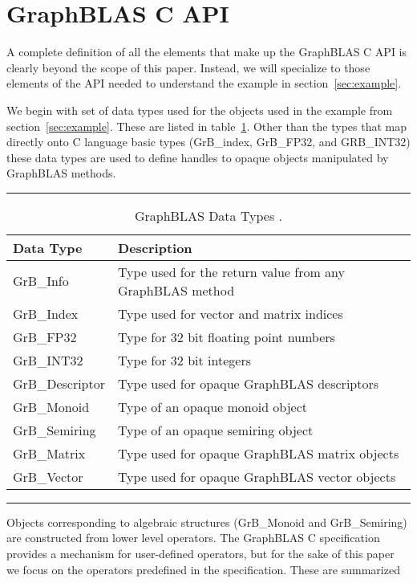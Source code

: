 \section{GraphBLAS C API}
\label{sec:Capi}
A complete definition of all the elements that make up the GraphBLAS C API
is clearly beyond the scope of this paper.  Instead, we will specialize to those
elements of the API needed to understand the example in section~\ref{sec:example}. 

We begin with set of data types used for the objects used in the example from section~\ref{sec:example}.
These are listed in table~\ref{Tab:GrBdataTypes}.  Other than the types that map directly onto
C language basic types (GrB\_index, GrB\_FP32, and GRB\_INT32) these data types
are used to define handles to opaque objects manipulated by GraphBLAS methods.
\begin{table}[h]
\hrule
\begin{center}
\caption{GraphBLAS Data Types .}
\label{Tab:GrBdataTypes}
\begin{tabular}{lp{5.25cm}}
Data Type               & Description  \\
\hline
GrB\_Info             & Type used for the return value from any GraphBLAS method \\
GrB\_Index          & Type used for vector and matrix indices \\
GrB\_FP32          & Type for 32 bit floating point numbers \\
GrB\_INT32         & Type for 32 bit integers \\
GrB\_Descriptor   & Type used for opaque GraphBLAS descriptors \\
GrB\_Monoid       & Type of an opaque monoid object  \\
GrB\_Semiring     & Type of an opaque semiring object  \\
GrB\_Matrix         & Type used for opaque GraphBLAS matrix objects \\
GrB\_Vector         & Type used for opaque GraphBLAS vector objects \\
\end{tabular}
\end{center}
\hrule
\end{table}
Objects corresponding to algebraic structures (GrB\_Monoid and GrB\_Semiring) are constructed from lower level
operators.   The GraphBLAS C specification provides a mechanism for user-defined operators, but for the 
sake of this paper we focus on the operators predefined in the specification.  These are summarized
